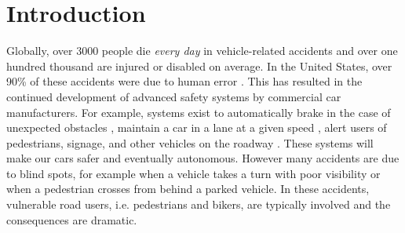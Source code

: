 
\section{Introduction}

%
%

Globally, over 3000 people die \emph{every day} \cite{ASIR2016} in vehicle-related accidents and over one hundred thousand are injured or disabled on average.
In the United States, over 90\% of these accidents were due to human error \cite{NHTSA_crash_stats}.
This has resulted in the continued development of advanced safety systems by commercial car manufacturers.
For example, systems exist to automatically brake in the case of unexpected obstacles \cite{Toyota_patent}, maintain a car in a lane at a given speed \cite{bradley2016tesla}, alert users of pedestrians, signage, and other vehicles on the roadway \cite{Dagan_IVS_2004}. These systems will make our cars safer and eventually autonomous.
However many accidents are due to blind spots, for example when a vehicle takes a turn with poor visibility or when a pedestrian crosses from behind a parked vehicle. In these accidents, vulnerable road users, i.e. pedestrians and bikers, are typically involved and the consequences are dramatic.

